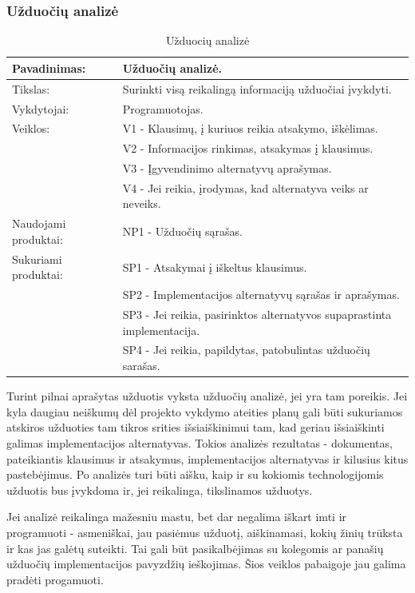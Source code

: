\documentclass{VUMIFPSkursinis}
\begin{document}
	\subsubsection{Užduočių analizė}
	\begin{center}
		\begin{table}[ht]
		\caption{Užduocių analizė}
		\begin{tabular}{ | l | l | } 
		\hline
		Pavadinimas:         & Užduočių analizė.                               \\ \hline
		Tikslas: 	           & Surinkti visą reikalingą informaciją užduočiai įvykdyti.\\ \hline
		Vykdytojai:          & Programuotojas.                          \\ \hline
		Veiklos:             & V1 - Klausimų, į kuriuos reikia atsakymo, iškėlimas.												\\ 
						             & V2 - Informacijos rinkimas, atsakymas į klausimus.\\ 
					 	             & V3 - Įgyvendinimo alternatyvų aprašymas.\\
					 	             & V4 - Jei reikia, įrodymas, kad alternatyva veiks ar neveiks.							 \\ \hline
		Naudojami produktai: & NP1 - Užduočių sąrašas. 																																															 \\ \hline
		Sukuriami produktai: & SP1 - Atsakymai į iškeltus klausimus.\\
								& SP2 - Implementacijos alternatyvų sąrašas ir aprašymas. \\
								& SP3 - Jei reikia, pasirinktos alternatyvos supaprastinta implementacija.\\ 
								& SP4 - Jei reikia, papildytas, patobulintas užduočių sarašas.\\\hline
		\end{tabular}
	\end{table}
		\end{center}
	Turint pilnai aprašytas užduotis vyksta užduočių analizė, jei yra tam poreikis. Jei kyla daugiau neiškumų dėl projekto vykdymo ateities planų gali būti sukuriamos atskiros užduoties tam tikros srities išsiaiškinimui tam, kad geriau išsiaiškinti galimas implementacijos alternatyvas. Tokios analizės rezultatas - dokumentas, pateikiantis klausimus ir atsakymus, implementacijos alternatyvas ir kilusius kitus pastebėjimus. Po analizės turi būti aišku, kaip ir su kokiomis technologijomis užduotis bus įvykdoma ir, jei reikalinga, tikslinamos užduotys. 
	\par Jei analizė reikalinga mažesniu mastu, bet dar negalima iškart imti ir programuoti - asmeniškai, jau pasiėmus užduotį, aiškinamasi, kokių žinių trūksta ir kas jas galėtų suteikti. Tai gali būt pasikalbėjimas su kolegomis ar panašių užduočių implementacijos pavyzdžių ieškojimas. Šios veiklos pabaigoje jau galima pradėti progamuoti.
\end{document}
